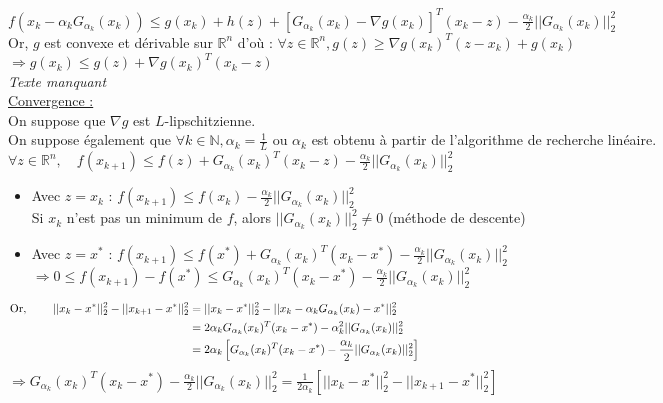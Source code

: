 \documentclass[12pt,a4paper]{article}
\begin{document}
$f(x_k - \alpha_k G_{\alpha_k}(x_k)) \leq g(x_k) + h(z) + [G_{\alpha_k}(x_k) - \nabla g(x_k)]^T (x_k - z) - \frac{\alpha_k}{2} ||G_{\alpha_k}(x_k)||_2^2$\\

Or, $g$ est convexe et dérivable sur $\mathbb{R}^n$ d'où :
$\forall z \in \mathbb{R}^n, g(z) \geq \nabla g(x_k)^T (z - x_k) + g(x_k)$\\
$\Rightarrow g(x_k) \leq g(z) + \nabla g(x_k)^T (x_k - z)$\\


\textit{Texte manquant}\\


\noindent \underline{Convergence :}\\
On suppose que $\nabla g$ est $L$-lipschitzienne.\\
On suppose également que $\forall k \in \mathbb{N}, \alpha_k = \frac{1}{L}$ ou $\alpha_k$ est obtenu à partir de l'algorithme de recherche linéaire.\\

\noindent $\forall z \in \mathbb{R}^n, \quad f(x_{k+1}) \leq f(z) + G_{\alpha_k}(x_k)^T (x_k - z) - \frac{\alpha_k}{2} ||G_{\alpha_k}(x_k)||_2^2$\\
\begin{itemize}
    \item Avec $z = x_k$ : $f(x_{k+1}) \leq f(x_k) - \frac{\alpha_k}{2} ||G_{\alpha_k}(x_k)||_2^2$\\
    Si $x_k$ n'est pas un minimum de $f$, alors $||G_{\alpha_k}(x_k)||_2^2 \neq 0$ (méthode de descente)\\

    \item Avec $z = x^*$ : $f(x_{k+1}) \leq f(x^*) + G_{\alpha_k}(x_k)^T (x_k - x^*) - \frac{\alpha_k}{2} ||G_{\alpha_k}(x_k)||_2^2$\\
    $\Rightarrow 0 \leq f(x_{k+1}) - f(x^*) \leq G_{\alpha_k}(x_k)^T (x_k - x^*) - \frac{\alpha_k}{2} ||G_{\alpha_k}(x_k)||_2^2$
\end{itemize}

\begin{align*}
    \text{Or, } \qquad ||x_k - x^*||_2^2 - ||x_{k+1} - x^*||_2^2 &= ||x_k - x^*||_2^2 - ||x_k - \alpha_k G_{\alpha_k}(x_k) - x^*||_2^2 \hspace{14.5cm}\\
    &= 2 \alpha_k G_{\alpha_k}(x_k)^T (x_k - x^*) - \alpha_k^2 ||G_{\alpha_k}(x_k)||_2^2\\
    &= 2 \alpha_k \left[ G_{\alpha_k}(x_k)^T (x_k - x^*) - \frac{\alpha_k}{2} ||G_{\alpha_k}(x_k)||_2^2 \right]
\end{align*}
$\Rightarrow G_{\alpha_k}(x_k)^T (x_k - x^*) - \frac{\alpha_k}{2} ||G_{\alpha_k}(x_k)||_2^2 = \frac{1}{2 \alpha_k} \left[ ||x_k - x^*||_2^2 - ||x_{k+1} - x^*||_2^2 \right]$\\
\end{document}
